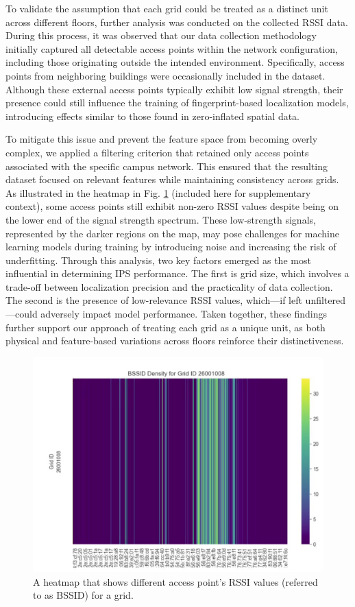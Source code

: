 \documentclass[conference]{IEEEtran}
\begin{document}
	To validate the assumption that each grid could be treated as a distinct unit across different floors, further analysis was conducted on the collected RSSI data. During this process, it was observed that our data collection methodology initially captured all detectable access points within the network configuration, including those originating outside the intended environment. Specifically, access points from neighboring buildings were occasionally included in the dataset. Although these external access points typically exhibit low signal strength, their presence could still influence the training of fingerprint-based localization models, introducing effects similar to those found in zero-inflated spatial data.
	
	To mitigate this issue and prevent the feature space from becoming overly complex, we applied a filtering criterion that retained only access points associated with the specific campus network. This ensured that the resulting dataset focused on relevant features while maintaining consistency across grids.
	As illustrated in the heatmap in Fig. \ref{fig:heatmap008} (included here for supplementary context), some access points still exhibit non-zero RSSI values despite being on the lower end of the signal strength spectrum. These low-strength signals, represented by the darker regions on the map, may pose challenges for machine learning models during training by introducing noise and increasing the risk of underfitting.
	Through this analysis, two key factors emerged as the most influential in determining IPS performance. The first is grid size, which involves a trade-off between localization precision and the practicality of data collection. The second is the presence of low-relevance RSSI values, which—if left unfiltered—could adversely impact model performance. Taken together, these findings further support our approach of treating each grid as a unique unit, as both physical and feature-based variations across floors reinforce their distinctiveness.
	
	\begin{figure}[htbp]
		\centerline{\includegraphics[scale=0.15]{meth3.jpg}}
		\caption{A heatmap that shows different access point’s RSSI values (referred to as BSSID) for a grid.}
		\label{fig:heatmap008}
	\end{figure}
	
\end{document}
